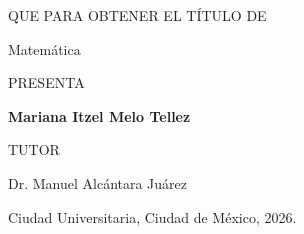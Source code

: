 \begin{titlepage}
\begin{minipage}[t]{0.78\textwidth}
  \vspace{1.4cm}
  
  {\small QUE PARA OBTENER EL TÍTULO DE\par}
  
  \vspace{0.3cm}
  
  {\normalsize Matemática\par}
  
  \vspace{1.2cm}
  
  {\small PRESENTA\par}
  
  \vspace{0.3cm}
  
  {\normalsize\textbf{Mariana Itzel Melo Tellez }\par}
  
  \vspace{1.3cm}
  
  {\small TUTOR\par}
  
  \vspace{0.3cm}
  
  {\normalsize Dr. Manuel Alcántara Juárez\par}
  
  \vspace{2cm}
  
  {\normalsize Ciudad Universitaria, Ciudad de México, 2026.}
  
  \end{minipage}
  
  \end{titlepage}
